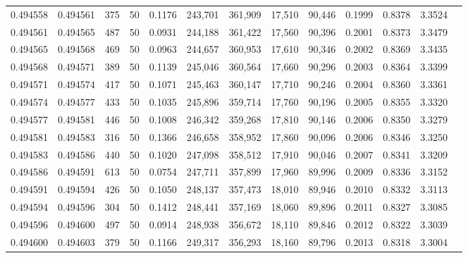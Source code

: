\begin{tabular}{rrrrrrrrrrrrr}
0.494558 & 0.494561 &   375 &  50 &                                     0.1176 & 243,701 & 361,909 &  17,510 &  90,446 & 0.1999 & 0.8378 & 3.3524 \\
0.494561 & 0.494565 &   487 &  50 &                                     0.0931 & 244,188 & 361,422 &  17,560 &  90,396 & 0.2001 & 0.8373 & 3.3479 \\
0.494565 & 0.494568 &   469 &  50 &                                     0.0963 & 244,657 & 360,953 &  17,610 &  90,346 & 0.2002 & 0.8369 & 3.3435 \\
0.494568 & 0.494571 &   389 &  50 &                                     0.1139 & 245,046 & 360,564 &  17,660 &  90,296 & 0.2003 & 0.8364 & 3.3399 \\
0.494571 & 0.494574 &   417 &  50 &                                     0.1071 & 245,463 & 360,147 &  17,710 &  90,246 & 0.2004 & 0.8360 & 3.3361 \\
0.494574 & 0.494577 &   433 &  50 &                                     0.1035 & 245,896 & 359,714 &  17,760 &  90,196 & 0.2005 & 0.8355 & 3.3320 \\
0.494577 & 0.494581 &   446 &  50 &                                     0.1008 & 246,342 & 359,268 &  17,810 &  90,146 & 0.2006 & 0.8350 & 3.3279 \\
0.494581 & 0.494583 &   316 &  50 &                                     0.1366 & 246,658 & 358,952 &  17,860 &  90,096 & 0.2006 & 0.8346 & 3.3250 \\
0.494583 & 0.494586 &   440 &  50 &                                     0.1020 & 247,098 & 358,512 &  17,910 &  90,046 & 0.2007 & 0.8341 & 3.3209 \\
0.494586 & 0.494591 &   613 &  50 &                                     0.0754 & 247,711 & 357,899 &  17,960 &  89,996 & 0.2009 & 0.8336 & 3.3152 \\
0.494591 & 0.494594 &   426 &  50 &                                     0.1050 & 248,137 & 357,473 &  18,010 &  89,946 & 0.2010 & 0.8332 & 3.3113 \\
0.494594 & 0.494596 &   304 &  50 &                                     0.1412 & 248,441 & 357,169 &  18,060 &  89,896 & 0.2011 & 0.8327 & 3.3085 \\
0.494596 & 0.494600 &   497 &  50 &                                     0.0914 & 248,938 & 356,672 &  18,110 &  89,846 & 0.2012 & 0.8322 & 3.3039 \\
0.494600 & 0.494603 &   379 &  50 &                                     0.1166 & 249,317 & 356,293 &  18,160 &  89,796 & 0.2013 & 0.8318 & 3.3004 \\

\end{tabular}
